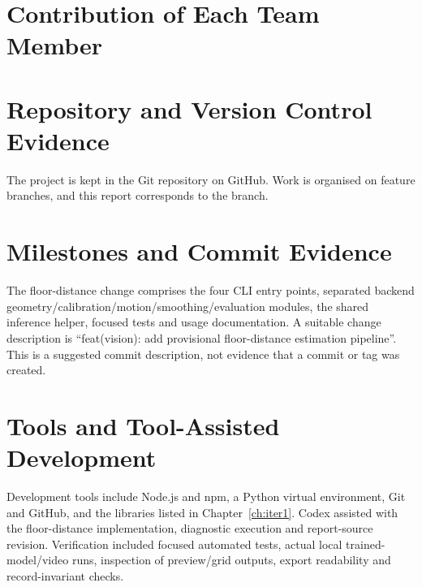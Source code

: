 \section{Contribution of Each Team Member}

\section{Repository and Version Control Evidence}
The project is kept in the Git repository  on GitHub. Work is organised on feature branches, and this report corresponds to the  branch.

\section{Milestones and Commit Evidence}
The floor-distance change comprises the four CLI entry points, separated backend geometry/calibration/motion/smoothing/evaluation modules, the shared inference helper, focused tests and usage documentation. A suitable change description is ``feat(vision): add provisional floor-distance estimation pipeline''. This is a suggested commit description, not evidence that a commit or tag was created. 

\section{Tools and Tool-Assisted Development}
Development tools include Node.js and npm, a Python virtual environment, Git and GitHub, and the libraries listed in Chapter~\ref{ch:iter1}. Codex assisted with the floor-distance implementation, diagnostic execution and report-source revision. Verification included focused automated tests, actual local trained-model/video runs, inspection of preview/grid outputs, export readability and record-invariant checks. 

